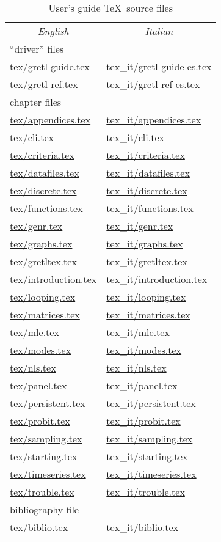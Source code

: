 \documentclass{article}
\begin{document}
\begin{table}[htbp]
\begin{center}
\begin{tabular}{ll}
\multicolumn{1}{c}{\textit{English}} & 
\multicolumn{1}{c}{\textit{Italian}} \\[6pt]
\multicolumn{2}{l}{``driver'' files} \\
\url{tex/gretl-guide.tex} & \url{tex_it/gretl-guide-es.tex} \\
\url{tex/gretl-ref.tex} & \url{tex_it/gretl-ref-es.tex} \\[6pt]
\multicolumn{2}{l}{chapter files} \\
\url{tex/appendices.tex} & \url{tex_it/appendices.tex} \\
\url{tex/cli.tex} & \url{tex_it/cli.tex} \\
\url{tex/criteria.tex} & \url{tex_it/criteria.tex} \\
\url{tex/datafiles.tex} & \url{tex_it/datafiles.tex} \\
\url{tex/discrete.tex} & \url{tex_it/discrete.tex} \\
\url{tex/functions.tex} & \url{tex_it/functions.tex} \\
\url{tex/genr.tex} & \url{tex_it/genr.tex} \\
\url{tex/graphs.tex} & \url{tex_it/graphs.tex} \\
\url{tex/gretltex.tex} & \url{tex_it/gretltex.tex} \\
\url{tex/introduction.tex} & \url{tex_it/introduction.tex} \\
\url{tex/looping.tex} & \url{tex_it/looping.tex} \\
\url{tex/matrices.tex} & \url{tex_it/matrices.tex} \\
\url{tex/mle.tex} & \url{tex_it/mle.tex} \\
\url{tex/modes.tex} & \url{tex_it/modes.tex} \\
\url{tex/nls.tex} & \url{tex_it/nls.tex} \\
\url{tex/panel.tex} & \url{tex_it/panel.tex} \\
\url{tex/persistent.tex} & \url{tex_it/persistent.tex} \\
\url{tex/probit.tex} & \url{tex_it/probit.tex} \\
\url{tex/sampling.tex} & \url{tex_it/sampling.tex} \\
\url{tex/starting.tex} & \url{tex_it/starting.tex} \\
\url{tex/timeseries.tex} & \url{tex_it/timeseries.tex} \\
\url{tex/trouble.tex} & \url{tex_it/trouble.tex} \\[6pt]
\multicolumn{2}{l}{bibliography file} \\
\url{tex/biblio.tex} & \url{tex_it/biblio.tex} \\
\end{tabular}
\end{center}
\caption{User's guide \TeX\ source files}
\label{guide-files}
\end{table}
\end{document}
